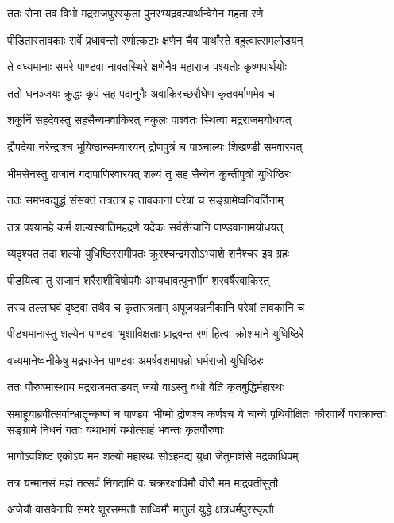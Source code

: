 \twolineshloka
{ततः सेना तव विभो मद्रराजपुरस्कृता}
{पुनरभ्यद्रवत्पार्थान्वेगेन महता रणे}


\twolineshloka
{पीडितास्तावकाः सर्वे प्रधावन्तो रणोत्कटाः}
{क्षणेन चैव पार्थांस्ते बहुत्वात्समलोडयन्}


\twolineshloka
{ते वध्यमानाः समरे पाण्डवा नावतस्थिरे}
{क्षणेनैव महाराज पश्यतोः कृष्णपार्थयोः}


\twolineshloka
{ततो धनञ्जयः क्रुद्धः कृपं सह पदानुगैः}
{अवाकिरच्छरौघेण कृतवर्माणमेव च}


\twolineshloka
{शकुनिं सहदेवस्तु सहसैन्यमवाकिरत्}
{नकुलः पार्श्वतः स्थित्वा मद्रराजमयोधयत्}


\twolineshloka
{द्रौपदेया नरेन्द्राश्च भूयिष्ठान्समवारयन्}
{द्रोणपुत्रं च पाञ्चाल्यः शिखण्डी समवारयत्}


\twolineshloka
{भीमसेनस्तु राजानं गदापाणिरवारयत्}
{शल्यं तु सह सैन्येन कुन्तीपुत्रो युधिष्ठिरः}


\twolineshloka
{ततः समभवद्युद्धं संसक्तं तत्रतत्र ह}
{तावकानां परेषां च सङ्ग्रामेष्वनिवर्तिनाम्}


\twolineshloka
{तत्र पश्यामहे कर्म शल्यस्यातिमहद्रणे}
{यदेकः सर्वसैन्यानि पाण्डवानामयोधयत्}


\twolineshloka
{व्यदृश्यत तदा शल्यो युधिष्ठिरसमीपतः}
{क्रूरश्चन्द्रमसोऽभ्याशे शनैश्चर इव ग्रहः}


\twolineshloka
{पीडयित्वा तु राजानं शरैराशीविषोपमैः}
{अभ्यधावत्पुनर्भीमं शरवर्षैरवाकिरत्}


\twolineshloka
{तस्य तल्लाघवं दृष्ट्वा तथैव च कृतास्त्रताम्}
{अपूजयन्ननीकानि परेषां तावकानि च}


\twolineshloka
{पीड्यमानास्तु शल्येन पाण्डवा भृशाविक्षताः}
{प्राद्रवन्त रणं हित्वा क्रोशमाने युधिष्ठिरे}


\twolineshloka
{वध्यमानेष्वनीकेषु मद्रराजेन पाण्डवः}
{अमर्षवशमापन्नो धर्मराजो युधिष्ठिरः}


\twolineshloka
{ततः पौरुषमास्थाय मद्रराजमताडयत्}
{जयो वाऽस्तु वधो वेति कृतबुद्धिर्महारथः}


समाहूयाब्रवीत्सर्वान्भ्रातॄन्कृष्णं च पाण्डवः
\threelineshloka
{भीष्मो द्रोणश्च कर्णश्च ये चान्ये पृथिवीक्षितः}
{कौरवार्थे पराक्रान्ताः सङ्ग्रामे निधनं गताः}
{यथाभागं यथोत्साहं भवन्तः कृतपौरुषाः}


\twolineshloka
{भागोऽवशिष्ट एकोऽयं मम शल्यो महारथः}
{सोऽहमद्य युधा जेतुमाशंसे मद्रकाधिपम्}


\twolineshloka
{तत्र यन्मानसं मह्यं तत्सर्वं निगदामि वः}
{चक्ररक्षाविमौ वीरौ मम माद्रवतीसुतौ}


\twolineshloka
{अजेयौ वासवेनापि समरे शूरसम्मतौ}
{साध्विमौ मातुलं युद्धे क्षत्रधर्मपुरस्कृतौ}


